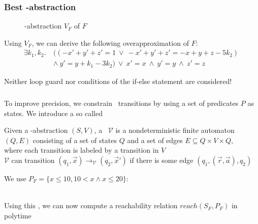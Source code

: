 \documentclass[%
10pt,
dvipsnames,
]{beamer}
\begin{document}
\begin{frame}[t]
	\frametitle{Best \qvasr-abstraction}
	\begin{center}
		\begin{figure}
		
		\caption*{\qvasr-abstraction $V_F$ of $F$}
		\end{figure}
	\end{center}
\pause
Using $V_F$, we can derive the following overapproximation of $F$:
	\begin{align*}
		\exists k_1, k_2.\ &((-x' + y' + z' = 1\ \lor\ -x' + y' + z' = -x + y + z - 5k_2)\ \\ &\land\ y' = y + k_1 - 3k_2)\ \lor\ x' = x\ \land\ y' = y\ \land\ z' = z
	\end{align*}
\pause
\vspace*{-0.5cm}
\begin{center}
\alert{Neither loop guard nor conditions of the if-else statement are considered!}
\end{center}
\end{frame}


\begin{frame}[t]
	\frametitle{\qvasrs}
	To improve precision, we constrain \qvasr\ transitions by using a set of predicates $P$ as states. We introduce a so called \qvasrs
	\begin{definition}
		Given a \qvasr-abstraction $(S,V)$, a \qvasrs\ $\mathcal{V}$ is a nondeterministic finite automaton $(Q, E)$ consisting of a set of states $Q$ and a set of edges $E \subseteq Q \times V \times Q$, \\
		where each transition is labeled by a transition in $V$ \\
		$\mathcal{V}$ can transition $(q_1, \vec{x}) \rightarrow_\mathcal{V} (q_2, \vec{x}')$ if there is some edge $(q_1, (\vec{r}, \vec{a}), q_2)$
	\end{definition}
	\begin{center}
	We use $P_F = \{ x \leq 10, 10 < x \land x \leq 20\}:$
		\end{center} \vspace{0.5cm}
	
\end{frame}

\begin{frame}
 \\
Using this \qvasrs, we can now compute a reachability relation $reach(S_F, P_F)$ in polytime \cite{DBLP:conf/rp/HaaseH14}
\end{frame}
\end{document}
